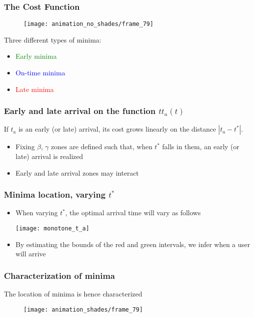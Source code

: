 \documentclass[hyperref={pdfpagelabels=false}]{beamer}
\begin{document}
\begin{frame}
  \frametitle{The Cost Function}
  \begin{figure}
    \centering
    \texttt{[image: animation\_no\_shades/frame\_79]}
  \end{figure}
  Three different types of minima:
  \begin{itemize}
  \item \textcolor{green}{Early minima}
  \item \textcolor{blue}{On-time minima}
  \item \textcolor{red}{Late minima}
  \end{itemize}
\end{frame}

\begin{frame}
  \frametitle{Early and late arrival on the function \(tt_a(t)\)}
  If \(t_a\) is an early (or late) arrival, its cost grows linearly on the distance \(|t_a - t^*|\).
  \begin{itemize}
  \item Fixing \(\beta\), \(\gamma\) zones are defined such that,
    when \(t^*\) falls in them, an early (or late) arrival is realized
  \item<2-> Early and late arrival zones may interact
  \end{itemize}
  \begin{center}
  \end{center}
\end{frame}

\begin{frame}
  \frametitle{Minima location, varying \(t^*\)}
  \begin{itemize}
  \item When varying \(t^*\), the optimal arrival time will vary as follows
    \begin{center}
      \texttt{[image: monotone\_t\_a]}
    \end{center}
  \item By estimating the bounds of the red and green intervals, we infer when a user will arrive
  \end{itemize}
\end{frame}

\begin{frame}
  \frametitle{Characterization of minima}
  The location of minima is hence characterized
  \begin{figure}
    \centering
    \texttt{[image: animation\_shades/frame\_79]}
  \end{figure}
\end{frame}
\end{document}
